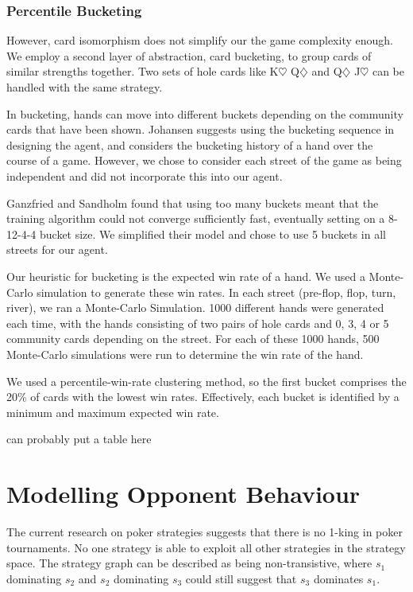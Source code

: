\documentclass{article}
\begin{document}
\subsubsection{Percentile Bucketing}
However, card isomorphism does not simplify our the game complexity enough. We employ a second layer of abstraction, card bucketing, to group cards of similar strengths together. Two sets of hole cards like K$\heartsuit$ Q$\diamondsuit$ and Q$\diamondsuit$ J$\heartsuit$ can be handled with the same strategy.

In bucketing, hands can move into different buckets depending on the community cards that have been shown. Johansen suggests using the bucketing sequence in designing the agent, and considers the bucketing history of a hand over the course of a game. However, we chose to consider each street of the game as being independent and did not incorporate this into our agent.

Ganzfried and Sandholm found that using too many buckets meant that the training algorithm could not converge sufficiently fast, eventually setting on a 8-12-4-4 bucket size. We simplified their model and chose to use 5 buckets in all streets for our agent.

Our heuristic for bucketing is the expected win rate of a hand. We used a Monte-Carlo simulation to generate these win rates. In each street (pre-flop, flop, turn, river), we ran a Monte-Carlo Simulation. 1000 different hands were generated each time, with the hands consisting of two pairs of hole cards and 0, 3, 4 or 5 community cards depending on the street. For each of these 1000 hands, 500 Monte-Carlo simulations were run to determine the win rate of the hand.

We used a percentile-win-rate clustering method, so the first bucket comprises the 20\% of cards with the lowest win rates. Effectively, each bucket is identified by a minimum and maximum expected win rate.

can probably put a table here

\section{Modelling Opponent Behaviour}

The current research on poker strategies suggests that there is no 1-king in poker tournaments. No one strategy is able to exploit all other strategies in the strategy space. The strategy graph can be described as being non-transistive, where $s_1$ dominating $s_2$ and $s_2$ dominating $s_3$ could still suggest that $s_3$ dominates $s_1$.
\end{document}
